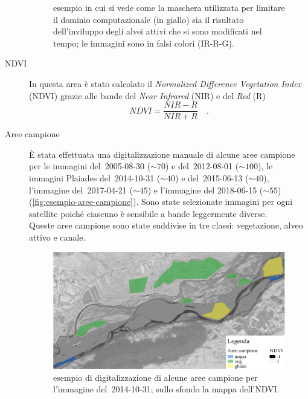 \begin{description}
\begin{figure}[t]
			{esempio in cui si vede come la maschera utilizzata per limitare il dominio computazionale (in giallo) sia il risultato dell'inviluppo degli alvei attivi che si sono modificati nel tempo; le immagini sono in falsi colori (IR-R-G).}
		\label{fig:esempio-maschera}
	\end{figure}
	\item[NDVI] 
	In questa area è stato calcolato il \emph{Normalized Difference Vegetation Index} (NDVI) grazie alle bande del \emph{Near Infrared} (NIR) e del \emph{Red} (R)
	\begin{equation}
		NDVI = \frac{NIR - R}{NIR + R} \quad .
		\label{eq:ndvi}
	\end{equation}
	\item[Aree campione]
	\`{E} stata effettuata una digitalizzazione manuale di alcune aree campione per le immagini \AST{} del~2005-08-30 ($\sim 70$) e del~2012-08-01 ($\sim 100$), le immagini Plaiades del~2014-10-31 ($\sim 40$) e del~2015-06-13 ($\sim 40$), l'immagine \Se{} del~2017-04-21 ($\sim 45$) e l'immagine \WV{} del 2018-06-15 ($\sim 55$) (\vref{fig:esempio-aree-campione}).
	Sono state selezionate immagini per ogni satellite poiché ciascuno è sensibile a bande leggermente diverse. 
	\\
	Queste aree campione sono state suddivise in tre classi: vegetazione, alveo attivo e canale.
	\begin{figure}[ht]
		\centering
		\includegraphics[width=\textwidth]{files/esempio_aree_campione_2014_10_31.jpeg}
		\caption[esempio di aree campione per calcolare la distribuzione dell'NDVI]{esempio di digitalizzazione di alcune aree campione per l'immagine \Pl{} del~2014-10-31; sullo sfondo la mappa dell'NDVI.}
		\label{fig:esempio-aree-campione}
	\end{figure}

\end{description}
